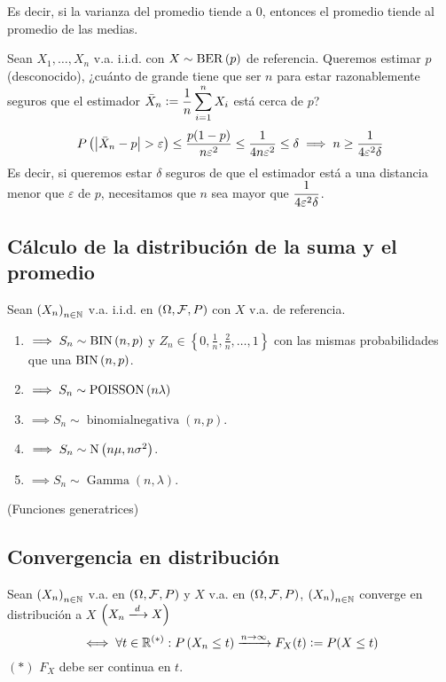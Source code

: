 Es decir, si la varianza del promedio tiende a 0, entonces el promedio tiende al promedio de las medias.

 Sean $X_1, \ldots, X_n$ v.a. i.i.d. con $X\sim \operatorname{BER}\left(p\right)$ de referencia. Queremos estimar $p$ (desconocido), ¿cuánto de grande tiene que ser $n$ para estar razonablemente seguros que el estimador $\displaystyle \Bar{X}_n \vcentcolon= \frac{1}{n}\sum_{i=1}^{n} X_i$ está cerca de $p$?
\[P\left(\left|\Bar{X}_n - p\right| > \varepsilon\right) \leq \frac{p(1-p)}{n\varepsilon^2} \leq \frac{1}{4n\varepsilon^2} \leq \delta \implies n \geq \frac{1}{4\varepsilon^2\delta}\]
Es decir, si queremos estar $\delta$ seguros de que el estimador está a una distancia menor que $\varepsilon$ de $p$, necesitamos que $n$ sea mayor que $\displaystyle \frac{1}{4\varepsilon^2\delta}$.

\subsection{Cálculo de la distribución de la suma y el promedio}

Sean $\left(X_n\right)_{n\in \mathbb{N}}$ v.a. i.i.d. en $(\Omega, \mathcal{F}, P)$ con $X$ v.a. de referencia.
\begin{enumerate}
	\item {} $\implies S_n \sim \operatorname{BIN}\left(n,p\right)$ y $Z_n \in \left\{0, \frac{1}{n}, \frac{2}{n}, \dots, 1\right\}$ con las mismas probabilidades que una $\operatorname{BIN}\left(n,p\right)$.
	\item {} $\implies S_n \sim \operatorname{POISSON}\left(n\lambda\right)$
	\item {} $\implies S_n \sim \operatorname{binomial negativa}(n,p)$.
	\item {} $\implies S_n \sim \operatorname{N}\left(n\mu, n\sigma^2\right)$.
	\item {} $\implies S_n \sim \operatorname{Gamma}(n,\lambda)$.
\end{enumerate}

 (Funciones generatrices)


\subsection{Convergencia en distribución}

\begin{defn}
	Sean $\left(X_n\right)_{n\in \mathbb{N}}$ v.a. en $(\Omega, \mathcal{F}, P)$ y $X$ v.a. en $(\Omega, \mathcal{F}, P)$, $\left(X_n\right)_{n\in \mathbb{N}}$ {converge en distribución} a $X$ $\left(X_n \xlongrightarrow{d} X\right)$
	\[\iff \forall t \in \mathbb{R}^{(*)} : P\left(X_n \leq t\right) \xrightarrow{n\to\infty} F_X(t) \vcentcolon= P(X \leq t)\]
	\hspace*{\fill} $(*)$ $F_X$ debe ser continua en $t$.
\end{defn}

